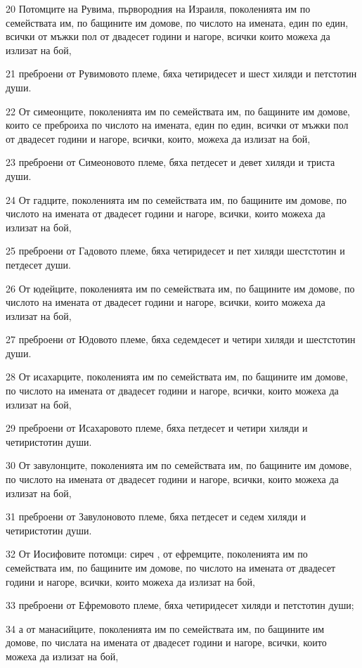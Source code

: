 \par 20 Потомците на Рувима, първородния на Израиля, поколенията им по семействата им, по бащините им домове, по числото на имената, един по един, всички от мъжки пол от двадесет години и нагоре, всички които можеха да излизат на бой,
\par 21 преброени от Рувимовото племе, бяха четиридесет и шест хиляди и петстотин души.
\par 22 От симеонците, поколенията им по семействата им, по бащините им домове, които се преброиха по числото на имената, един по един, всички от мъжки пол от двадесет години и нагоре, всички, които, можеха да излизат на бой,
\par 23 преброени от Симеоновото племе, бяха петдесет и девет хиляди и триста души.
\par 24 От гадците, поколенията им по семействата им, по бащините им домове, по числото на имената от двадесет години и нагоре, всички, които можеха да излизат на бой,
\par 25 преброени от Гадовото племе, бяха четиридесет и пет хиляди шестстотин и петдесет души.
\par 26 От юдейците, поколенията им по семействата им, по бащините им домове, по числото на имената от двадесет години и нагоре, всички, които можеха да излизат на бой,
\par 27 преброени от Юдовото племе, бяха седемдесет и четири хиляди и шестстотин души.
\par 28 От исахарците, поколенията им по семействата им, по бащините им домове, по числото на имената от двадесет години и нагоре, всички, които можеха да излизат на бой,
\par 29 преброени от Исахаровото племе, бяха петдесет и четири хиляди и четиристотин души.
\par 30 От завулонците, поколенията им по семействата им, по бащините им домове, по числото на имената от двадесет години и нагоре, всички, които можеха да излизат на бой,
\par 31 преброени от Завулоновото племе, бяха петдесет и седем хиляди и четиристотин души.
\par 32 От Иосифовите потомци: сиреч , от ефремците, поколенията им по семействата им, по бащините им домове, по числото на имената от двадесет години и нагоре, всички, които можеха да излизат на бой,
\par 33 преброени от Ефремовото племе, бяха четиридесет хиляди и петстотин души;
\par 34 а от манасийците, поколенията им по семействата им, по бащините им домове, по числата на имената от двадесет години и нагоре, всички, които можеха да излизат на бой,

